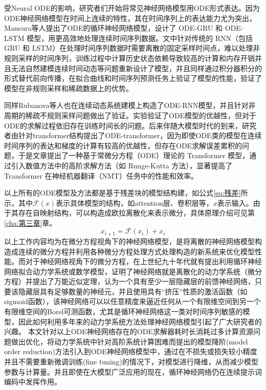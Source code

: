 受Neural ODE的影响，研究者们开始将常见神经网络模型用ODE形式表达。因为ODE神经网络模型在时间上连续的特性，其在时间序列上的表达能力尤为突出，Mansura等人提出了ODE的循环神经网络模型\cite{habibaNeuralOrdinaryDifferential2020}，设计了 ODE-GRU 和 ODE-LSTM 模型，用更高效地处理连续时间序列数据。文中针对传统的 RNN（包括 GRU 和 LSTM）在处理时间序列数据时需要离散的固定采样时间点，难以处理非规则采样的时间序列，训练过程中计算历史状态依赖导致较高的计算和内存开销并且无法自然建模连续时间动态等问题重新设计了模型，并且同样通过积分器积分的形式替代前向传播，在拟合曲线和时间序列预测任务上验证了模型的性能，验证了模型在非规则采样和稀疏数据上的优势。

同样Rubanova\cite{rubanovaLatentODEsIrregularlySampled}等人也在连续动态系统建模上构造了ODE-RNN模型，并且针对非周期的稀疏不规则采样问题做出了验证。实验验证了ODE模型的优越性，但对于ODE的求解过程依旧存在训练时间长的问题。后来伴随大模型时代的到来，研究者由针对transformer结构提出了ODE-transformer\cite{liODETransformerOrdinary2021}，因为即使ODE类的模型在连续时间序列的表达和梯度的计算有较高的优越性，但存在ODE求解误差累积的问题，于是文章提出了一种基于常微分方程（ODE）理论的 Transformer 模型，通过引入数值方法中的高阶求解方法（如 Runge-Kutta 方法），显著提高了 Transformer 在神经机器翻译（NMT）任务中的性能和效率。

以上所有的ODE模型及方法都是基于残差块\cite{eProposalMachineLearning2017}的模型结构建，如公式\ref{eq:残差}所示，其中\(\mathcal{F}(x)\)表示具体模型的结构，如attention层、卷积层等，$x$表示输入。由于其存在自映射结构，可以构造成欧拉离散化来表示微分，具体原理介绍可见第\ref{cha:第三章}章。
\begin{equation}
  \label{eq:残差}
  x_{i+1} = \mathcal{F}(x_i) + x_i
\end{equation}
以上工作内容均为在微分方程视角下的神经网络模型，是将离散的神经网络模型构造成连续的微分方程并利用各种微分方程处理方式处理构造的新系统来优化模型性能。而对于神经网络视角下的微分方程，在上世纪九十年代就有提出利用循环神经网络拟合动力学系统或数学模型\cite{cybenkotApproximationSuperpositionsSigmoidal,liDeepLearningDynamical2020,caoBRITSBidirectionalRecurrent,pearlmutterLearningStateSpace,neilPhasedLSTMAccelerating,cheRecurrentNeuralNetworks2018}，证明了神经网络就是离散化的动力学系统（微分方程）并提出了万能近似定理，认为一个具有至少一层隐藏层的前馈神经网络，只要该隐藏层具有足够数量的神经元，并且使用具有“挤压”性质的激活函数（如sigmoid函数），该神经网络可以以任意精度来逼近任何从一个有限维空间到另一个有限维空间的Borel可测函数，尤其是循环神经网络这一类对时间序列敏感的模型，因此如何利用多年来的动力学系统方法处理神经网络模型引起了广大研究者的兴趣。
本文针对以上ODE神经网络存在的ODE求解器耗时长消耗过多计算资源问题做出优化，将动力学系统中针对高阶系统计算困难而提出的模型降阶(model order reduction)方法引入到ODE神经网络模型中，通过在不损失或损失较小精度并且不需要重新微调训练(fine tuning)的情况下，对模型进行降维，从而减少模型参数与计算量。并且即使在大模型广泛应用的现在，循环神经网络仍在连续提示词编码中发挥作用。


